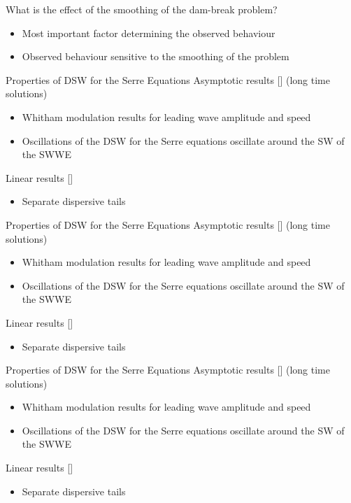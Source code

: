 \documentclass[pdf]{beamer}
\begin{document}
\begin{frame}{What is the effect of the smoothing of the dam-break problem?}
	\begin{itemize}
		\item Most important factor determining the observed behaviour
		\item Observed behaviour sensitive to the smoothing of the problem
	\end{itemize}
\end{frame}


\begin{frame}{Properties of DSW for the Serre Equations}
	Asymptotic results [] (long time solutions)
	\begin{itemize}
		\item Whitham modulation results for leading wave amplitude and speed
		\item Oscillations of the DSW for the Serre equations oscillate around the SW of the SWWE \newline 
	\end{itemize}
	Linear results []
	\begin{itemize}
		\item Separate dispersive tails
	\end{itemize}
\end{frame}	

\begin{frame}{Properties of DSW for the Serre Equations}
	Asymptotic results [] (long time solutions)
	\begin{itemize}
		\item[{\color{green!60!black}\checkmark}] Whitham modulation results for leading wave amplitude and speed 
		\item Oscillations of the DSW for the Serre equations oscillate around the SW of the SWWE \newline 
	\end{itemize}
	Linear results []
	\begin{itemize}
		\item Separate dispersive tails
	\end{itemize}
\end{frame}	

\begin{frame}{Properties of DSW for the Serre Equations}
	Asymptotic results [] (long time solutions)
	\begin{itemize}
		\item[{\color{green!60!black}\checkmark}] Whitham modulation results for leading wave amplitude and speed 
		\item[{\color{green!60!black}\checkmark}] Oscillations of the DSW for the Serre equations oscillate around the SW of the SWWE \newline 
	\end{itemize}
	Linear results []
	\begin{itemize}
		\item  Separate dispersive tails
	\end{itemize}
\end{frame}
\end{document}

